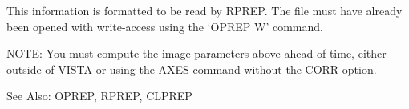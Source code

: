 This information is formatted to be read by RPREP.  The file must have
already been opened with write-access using the `OPREP W' command.

NOTE: You must compute the image parameters above ahead of time, either
outside of VISTA or using the AXES command without the CORR option.

See Also:  OPREP, RPREP, CLPREP
